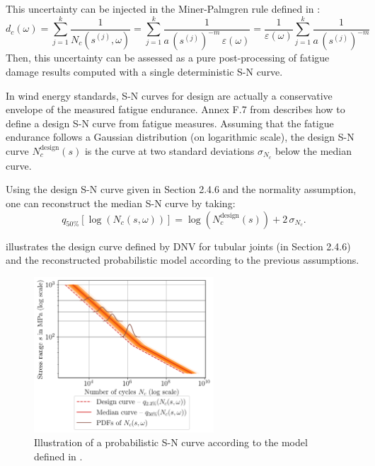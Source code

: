 This uncertainty can be injected in the Miner-Palmgren rule defined in : 
\begin{equation}
    d_c(\omega) = \sum_{j=1}^k \frac{1}{N_c(s^{(j)}, \omega)}
            = \sum_{j=1}^k \frac{1}{a \, \left(s^{(j)}\right)^{-m} \, \varepsilon(\omega)}
            = \frac{1}{\varepsilon(\omega)} \sum_{j=1}^k \frac{1}{a \, \left(s^{(j)}\right)^{-m}}
\end{equation}
Then, this uncertainty can be assessed as a pure post-processing of fatigue damage results computed with a single deterministic S-N curve. 

In wind energy standards, S-N curves for design are actually a conservative envelope of the measured fatigue endurance. 
Annex F.7 from \citet{dnv_fatigue_2016} describes how to define a design S-N curve from fatigue measures. 
Assuming that the fatigue endurance follows a Gaussian distribution (on logarithmic scale), the design S-N curve $N_c^{\mathrm{design}}(s)$ is the curve at two standard deviations $\sigma_{N_c}$ below the median curve. 

Using the design S-N curve given in Section 2.4.6 \citet{dnv_fatigue_2016} and the normality assumption, one can reconstruct the median S-N curve by taking: 
\begin{equation}
    q_{50\%}[\log(N_c(s, \omega))]= \log(N_c^{\mathrm{design}}(s)) + 2 \, \sigma_{N_c}. 
\end{equation}

 illustrates the design curve defined by DNV for tubular joints (in Section 2.4.6) and the reconstructed probabilistic model according to the previous assumptions. 

\begin{figure}
    \centering
    \includegraphics[width=0.6\textwidth]{../numerical_experiments/chapter2/figures/probabilistic_fatigue.png}
    \caption{Illustration of a probabilistic S-N curve according to the model defined in \citet{guede_2007}.}
    \label{fig:probabilistic_SN}
\end{figure}


